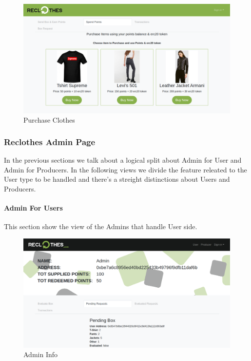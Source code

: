 {\begin{figure}[h!]
    \centering
    \includegraphics[totalheight=7.5cm]{img/dapp/user-buy.png}
    \caption{Purchase Clothes}
    \label{fig:purchase_clothes}
\end{figure}

\subsubsection{Reclothes Admin Page}

In the previous sections we talk about a logical split about Admin for User and Admin for Producers.
In the following views we divide the feature releated to the User type to be handled and there's a 
streight distinctions about Users and Producers.

\paragraph{Admin For Users}

This section show the view of the Admins that handle User side.

\begin{figure}[h!]
    \centering
    \includegraphics[totalheight=7.5cm]{img/dapp/admin-info.png}
    \caption{Admin Info}
    \label{fig:admin_info}
\end{figure}

}
